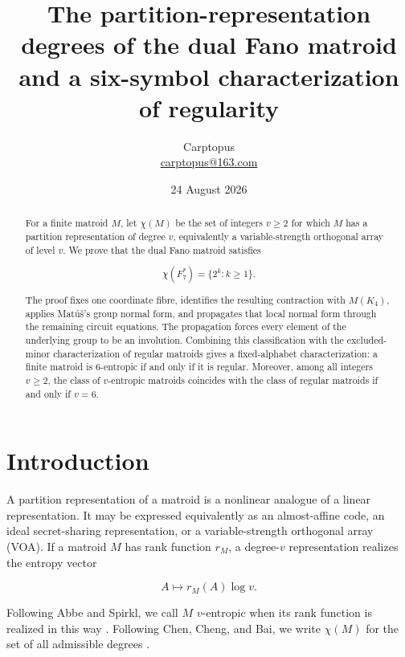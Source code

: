 \documentclass[11pt]{article}
\title{The partition-representation degrees of the dual Fano matroid\\
and a six-symbol characterization of regularity}
\author{Carptopus\\\href{mailto:carptopus@163.com}{carptopus@163.com}}
\date{24 August 2026}
\numberwithin{equation}{section}
\begin{document}
\maketitle

\begin{center}
\end{center}

\begin{abstract}


For a finite matroid $M$, let $\chi(M)$ be the set of integers $v\ge 2$ for
which $M$ has a partition representation of degree $v$, equivalently a
variable-strength orthogonal array of level $v$. We prove that the dual Fano
matroid satisfies

\nopagebreak[4]
\[
\chi(F_7^*)=\{2^k:k\ge 1\}.
\]

The proof fixes one coordinate fibre, identifies the resulting contraction
with $M(K_4)$, applies Mat\'u\v{s}'s group normal form, and propagates that local
normal form through the remaining circuit equations. The propagation forces
every element of the underlying group to be an involution. Combining this
classification with the excluded-minor characterization of regular matroids
gives a fixed-alphabet characterization: a finite matroid is 6-entropic if
and only if it is regular. Moreover, among all integers $v\ge 2$, the
class of $v$-entropic matroids coincides with the class of regular matroids
if and only if $v=6$.

\end{abstract}

\section{Introduction}


A partition representation of a matroid is a nonlinear analogue of a linear
representation. It may be expressed equivalently as an almost-affine code, an
ideal secret-sharing representation, or a variable-strength orthogonal array
(VOA). If a matroid $M$ has rank function $r_M$, a degree-$v$
representation realizes the entropy vector

\nopagebreak[4]
\[
A\longmapsto r_M(A)\log v.
\]

Following Abbe and Spirkl, we call $M$ $v$-entropic when its rank function
is realized in this way \cite{abbe2019}. Following Chen, Cheng, and Bai, we write
$\chi(M)$ for the set of all admissible degrees \cite{chen2025}.
\end{document}
